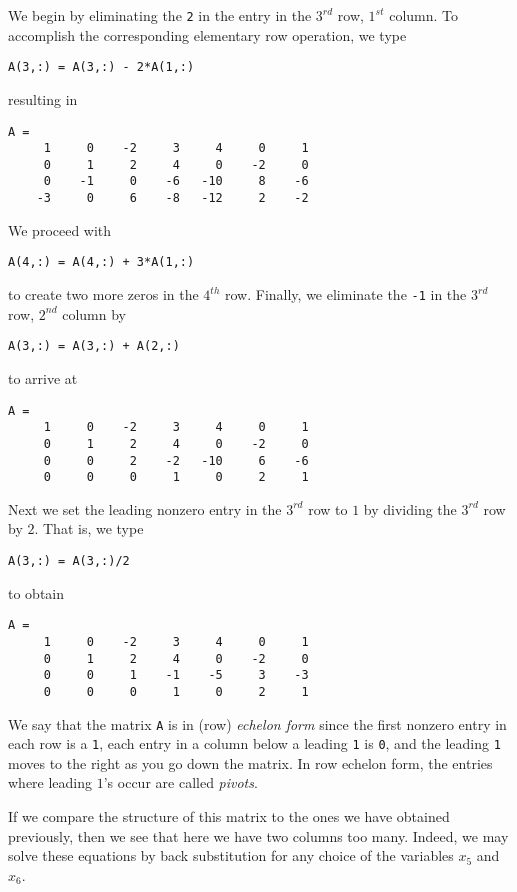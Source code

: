 \documentclass{ximera}
\begin{document}
We begin by eliminating the {\tt 2} in the entry in the $3^{rd}$
row, $1^{st}$ column.  To accomplish the corresponding
elementary row operation, we type
\begin{verbatim}
A(3,:) = A(3,:) - 2*A(1,:)
\end{verbatim}
resulting in
\begin{verbatim}
A =
     1     0    -2     3     4     0     1
     0     1     2     4     0    -2     0
     0    -1     0    -6   -10     8    -6
    -3     0     6    -8   -12     2    -2
\end{verbatim}
We proceed with
\begin{verbatim}
A(4,:) = A(4,:) + 3*A(1,:)
\end{verbatim}
to create two more zeros in the $4^{th}$ row.  Finally, we
eliminate the {\tt -1} in the $3^{rd}$ row, $2^{nd}$
column by
\begin{verbatim}
A(3,:) = A(3,:) + A(2,:)
\end{verbatim}
to arrive at
\begin{verbatim}
A =
     1     0    -2     3     4     0     1
     0     1     2     4     0    -2     0
     0     0     2    -2   -10     6    -6
     0     0     0     1     0     2     1
\end{verbatim}
Next we set the leading nonzero entry in the $3^{rd}$ row to $1$
by dividing the $3^{rd}$ row by $2$.   That is, we type
\begin{verbatim}
A(3,:) = A(3,:)/2
\end{verbatim}
to obtain
\begin{verbatim}
A =
     1     0    -2     3     4     0     1
     0     1     2     4     0    -2     0
     0     0     1    -1    -5     3    -3
     0     0     0     1     0     2     1
\end{verbatim}
We say that the matrix {\tt A} is in (row) {\em echelon form\/}
 since the first nonzero entry in each row
is a {\tt 1}, each entry in a column below a leading {\tt 1} is
{\tt 0}, and the leading {\tt 1} moves to the right as you go
down the matrix.  In row echelon form, the entries where leading
$1$'s occur are called {\em pivots\/}.

If we compare the structure of this matrix to the ones we have
obtained previously, then we see that here we have two columns
too many.  Indeed, we may solve these equations by back
substitution for any choice of the variables $x_5$ and $x_6$.
\end{document}
